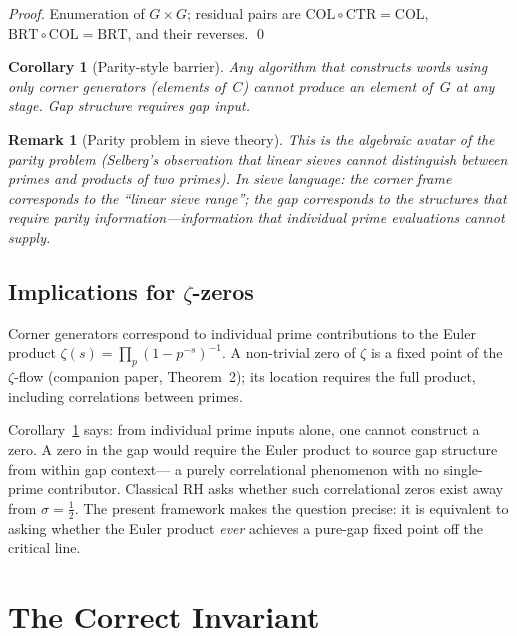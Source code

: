 \documentclass[11pt]{article}
\newtheorem{corollary}{Corollary}
\newtheorem{remark}{Remark}
\begin{document}
\begin{proof}
Enumeration of $G\times G$; residual pairs are
$\mathrm{COL}\circ\mathrm{CTR}=\mathrm{COL}$,
$\mathrm{BRT}\circ\mathrm{COL}=\mathrm{BRT}$,
and their reverses. \qed
\end{proof}

\begin{corollary}[Parity-style barrier]\label{cor:parity}
Any algorithm that constructs words using only corner generators
(elements of~$C$) cannot produce an element of~$G$ at any stage.
Gap structure requires gap input.
\end{corollary}

\begin{remark}[Parity problem in sieve theory]
This is the algebraic avatar of the parity problem
(Selberg's observation that linear sieves cannot distinguish
between primes and products of two primes).
In sieve language: the corner frame corresponds to the
``linear sieve range''; the gap corresponds to the structures
that require parity information---information that individual
prime evaluations cannot supply.
\end{remark}

\subsection{Implications for \texorpdfstring{$\zeta$}{ζ}-zeros}

Corner generators correspond to individual prime contributions to
the Euler product $\zeta(s)=\prod_p(1-p^{-s})^{-1}$.
A non-trivial zero of $\zeta$ is a fixed point of the
$\zeta$-flow (companion paper, Theorem~2); its location requires
the full product, including correlations between primes.

Corollary~\ref{cor:parity} says: from individual prime inputs alone,
one cannot construct a zero.  A zero in the gap would require the
Euler product to source gap structure from within gap context---
a purely correlational phenomenon with no single-prime contributor.
Classical RH asks whether such correlational zeros exist away from
$\sigma=\tfrac12$.  The present framework makes the question precise:
it is equivalent to asking whether the Euler product
\emph{ever} achieves a pure-gap fixed point off the critical line.

\section{The Correct Invariant}
\end{document}
